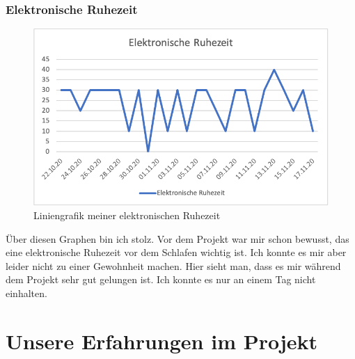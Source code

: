 \subsubsection{Elektronische Ruhezeit}
\begin{figure}[!ht]
  \centering
  \includegraphics[width=0.6\linewidth]{./images/ruhezeit_jonas.png}
  \caption{Liniengrafik meiner elektronischen Ruhezeit}
  \label{fig:ruhezeit_jonas}
\end{figure}
Über diesen Graphen bin ich stolz. Vor dem Projekt war mir schon bewusst, das eine elektronische Ruhezeit vor dem Schlafen wichtig ist. Ich konnte es mir aber leider nicht zu einer Gewohnheit machen. Hier sieht man, dass es mir während dem Projekt sehr gut gelungen ist. Ich konnte es nur an einem Tag nicht einhalten.
\section{Unsere Erfahrungen im Projekt}
